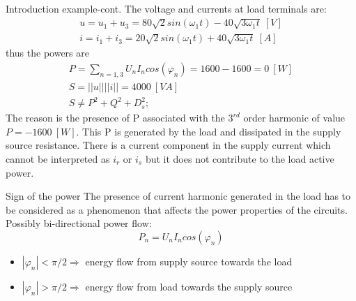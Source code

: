 \documentclass[aspectratio=169]{beamer}
\begin{document}
\begin{frame}{Introduction example-cont.}{\insertsection}
    The voltage and currents at load terminals are:
    \begin{gather}
      u=u_1+u_3 = 80\sqrt{2}sin(\omega_1t)-40\sqrt{3\omega_1t} \ \left[V\right]\\
      i=i_1+i_3 = 20\sqrt{2}sin(\omega_1t)+40\sqrt{3\omega_1t} \ \left[A\right]
    \end{gather}
    thus the powers are 
    \begin{gather}
      P=\sum_{n=1,3}U_nI_n cos(\varphi_n)=1600-1600=0 \ \left[W\right]\\
      S = ||u||||i|| = 4000 \ \left[VA\right]\\
      S \ne P^2+Q^2+D_s^2;
    \end{gather}
    The reason is the presence of P associated with the $3^{rd}$ order harmonic of value $P=-1600\ \left[W\right]$. This P is generated by the load and dissipated in the supply source resistance. \textcolor{NTNU_orange}{There is a current component in the supply current which cannot be interpreted as $i_r$ or $i_s$ but it does not contribute to the load active power.}
  \end{frame}

  \begin{frame}{Sign of the power}{\insertsection}
    \textcolor{NTNU_orange}{The presence of current harmonic generated in the load has to be considered as a phenomenon that affects the power properties of the circuits.}\\
    Possibly bi-directional power flow:
    \begin{equation}
      P_n = U_nI_n cos(\varphi_n)
    \end{equation}
    \begin{itemize}
      \item $|\varphi_n|<\pi/2 \Rightarrow$ energy flow from \textcolor{NTNU_purple}{supply source} towards the \textcolor{NTNU_green}{load}
      \item $|\varphi_n| >\pi/2 \Rightarrow$ energy flow  from \textcolor{NTNU_green}{load} towards the \textcolor{NTNU_purple}{supply source}
    \end{itemize}
\end{frame}
\end{document}
